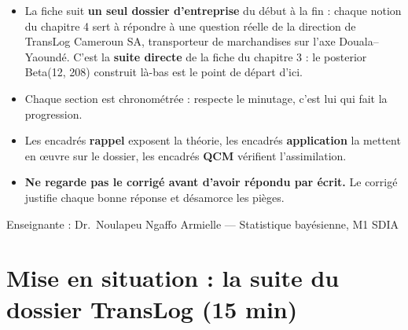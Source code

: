 \documentclass[11pt,a4paper]{article}
\begin{document}
\begin{titlepage}
\vspace{8mm}
\begin{contexte}
\begin{itemize}[leftmargin=4mm, itemsep=1mm]
  \item La fiche suit \textbf{un seul dossier d'entreprise} du début à la fin :
        chaque notion du chapitre 4 sert à répondre à une question réelle de la
        direction de TransLog Cameroun SA, transporteur de marchandises sur
        l'axe Douala--Yaoundé. C'est la \textbf{suite directe} de la fiche du
        chapitre 3 : le posterior Beta(12, 208) construit là-bas est le point
        de départ d'ici.
  \item Chaque section est chronométrée : respecte le minutage, c'est lui qui
        fait la progression.
  \item Les encadrés \textcolor{blue!60!black}{\bfseries rappel} exposent la théorie,
        les encadrés \textcolor{green!50!black}{\bfseries application} la mettent en
        œuvre sur le dossier, les encadrés \textcolor{orange!80!black}{\bfseries QCM}
        vérifient l'assimilation.
  \item \textbf{Ne regarde pas le corrigé avant d'avoir répondu par écrit.}
        Le corrigé justifie chaque bonne réponse et désamorce les pièges.
\end{itemize}
\end{contexte}

\vfill
{\small Enseignante : Dr.\ Noulapeu Ngaffo Armielle --- Statistique bayésienne, M1 SDIA}
\end{titlepage}

\tableofcontents
\newpage

\section{Mise en situation : la suite du dossier TransLog (15 min)}
\end{document}
